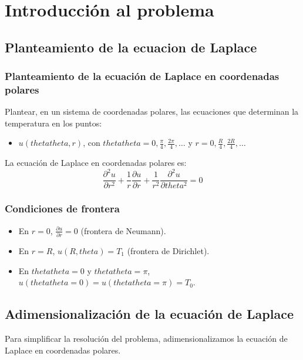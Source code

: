 \chapter{Introducción al problema}

\section{Planteamiento de la ecuacion de Laplace}

\subsection{Planteamiento de la ecuación de Laplace en coordenadas polares}

Plantear, en un sistema de coordenadas polares, las ecuaciones que determinan la temperatura en los puntos:

\begin{itemize}
    \item \(u(thetatheta,r)\), con \(thetatheta = 0, \frac{\pi}{4}, \frac{2\pi}{4}, \dots\) y \(r = 0, \frac{R}{4}, \frac{2R}{4}, \dots\)
\end{itemize}

La ecuación de Laplace en coordenadas polares es:
\begin{equation}
    \frac{\partial^2 u}{\partial r^2} + \frac{1}{r}\frac{\partial u}{\partial r} + \frac{1}{r^2}\frac{\partial^2 u}{\partial theta^2} = 0
\end{equation}

\subsection{Condiciones de frontera}
\begin{itemize}
    \item En \(r = 0\), \(\frac{\partial u}{\partial r} = 0\) (frontera de Neumann).
    \item En \(r = R\), \(u(R, theta) = T_1\) (frontera de Dirichlet).
    \item En \(thetatheta = 0\) y \(thetatheta = \pi\), \(u(thetatheta = 0) = u(thetatheta = \pi) = T_0\).
\end{itemize}

\section{Adimensionalización de la ecuación de Laplace}

Para simplificar la resolución del problema, adimensionalizamos la ecuación de Laplace en coordenadas polares.

